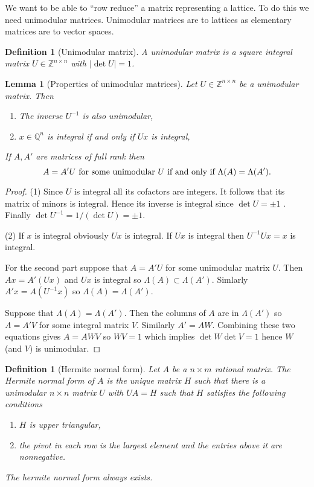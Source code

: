 \documentclass[10pt]{article}
\theoremstyle{plain}
\newtheorem{lemma}[theorem]{Lemma}
\newtheorem{definition}[theorem]{Definition}
\theoremstyle{definition}
\newcommand{\Z}{\mathbb{Z}}
\newcommand{\Q}{\mathbb{Q}}
\begin{document}
We want to be able to ``row reduce'' a matrix representing a lattice.
To do this we need unimodular matrices.
Unimodular matrices are to lattices as elementary matrices are to vector spaces.

\begin{definition}[Unimodular matrix]
    A \emph{unimodular} matrix is a square integral matrix \( U \in \Z^{n \times n} \) with \( |\det U| = 1 \).
\end{definition}

\begin{lemma}[Properties of unimodular matrices]
    Let \( U \in \Z^{n \times n}\) be a unimodular matrix. Then
    \begin{enumerate}
        \item The inverse \( U^{-1} \) is also unimodular,
        \item \( x \in \Q^n \) is integral if and only if \( Ux \) is integral,
    \end{enumerate}
    If \( A, A' \) are matrices of full rank then
    \[
        A = A'U \text{ for some unimodular \( U \) if and only if } \Lambda(A) = \Lambda(A').
    \]
\end{lemma}
\begin{proof}
    (1) Since \( U \) is integral all its cofactors are integers.
    It follows that its matrix of minors is integral.
    Hence its inverse is integral since \( \det U = \pm 1 \) .
    Finally \( \det U^{-1} = 1 / (\det U) = \pm 1\).

    (2) If \( x \) is integral obviously \( Ux \) is integral.
    If \( Ux \) is integral then \( U^{-1}Ux = x \) is integral.

    For the second part suppose that \( A = A'U \) for some unimodular matrix \( U \).
    Then \( Ax = A'(Ux) \) and \( Ux \) is integral so \( \Lambda(A) \subset \Lambda(A') \).
    Simlarly \( A'x = A(U^{-1}x) \) so \( \Lambda(A) = \Lambda(A') \).

    Suppose that \( \Lambda(A) = \Lambda(A') \).
    Then the columns of \( A \) are in \( \Lambda(A') \) so \( A = A'V \) for some integral matrix \( V \).
    Similarly \( A' = AW \).
    Combining these two equations gives \( A = AWV \) so \( WV  = 1 \) which implies \( \det W \det V = 1 \) hence \( W \) (and \( V \)) is unimodular.
\end{proof}

\begin{definition}[Hermite normal form]
    Let \( A \) be a \( n \times m \) rational matrix.
    The \emph{Hermite normal form} of \( A \) is the unique matrix \( H \) such that there is a unimodular \( n \times n \) matrix \( U \) with \( UA = H \) such that \( H \) satisfies the following conditions
    \begin{enumerate}
        \item \( H \) is upper triangular,
        \item the pivot in each row is the largest element and the entries above it are nonnegative.
    \end{enumerate}
    The hermite normal form always exists.
\end{definition}
\end{document}
